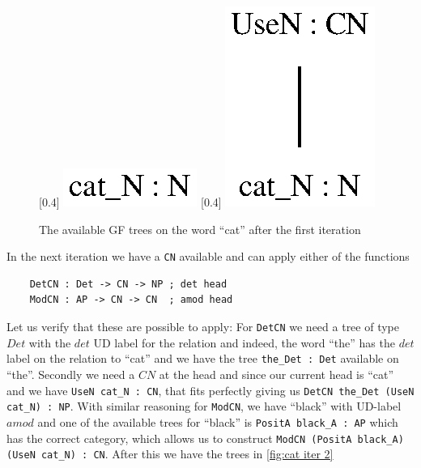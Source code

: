 \begin{figure}[H]
    \centering
    [0.4\textwidth]
        {\includegraphics[scale=0.75]{thesis/figure/black_cats/cat_N_gf.eps}}
    [0.4\textwidth]
        {\includegraphics[scale=0.75]{thesis/figure/black_cats/cat_CN_gf.eps}}
    \caption{The available GF trees on the word ``cat'' after the first iteration}\label{fig:cat iter 1}
\end{figure}

In the next iteration we have a \lstinline|CN| available and can apply either of the functions
\begin{lstlisting}
    DetCN : Det -> CN -> NP ; det head
    ModCN : AP -> CN -> CN  ; amod head
\end{lstlisting}
Let us verify that these are possible to apply: For \lstinline|DetCN| we need a tree of type $Det$ with the $det$ \ac{UD} label for the relation and indeed, the word ``the'' has the $det$ label on the relation to ``cat'' and we have the tree \lstinline|the_Det : Det| available on ``the''. Secondly we need a $CN$ at the head and since our current head is ``cat'' and we have \lstinline|UseN cat_N : CN|, that fits perfectly giving us \lstinline|DetCN the_Det (UseN cat_N) : NP|. With similar reasoning for \lstinline{ModCN}, we have ``black'' with \ac{UD}-label $amod$ and one of the available trees for ``black'' is \lstinline|PositA black_A : AP| which has the correct category, which allows us to construct \lstinline|ModCN (PositA black_A) (UseN cat_N) : CN|. After this we have the trees in \autoref{fig:cat iter 2}

